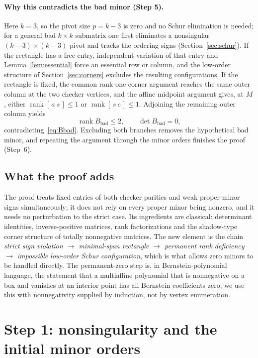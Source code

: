 \documentclass[10pt,a4paper]{article}
\theoremstyle{definition}
\theoremstyle{remark}
\numberwithin{equation}{section}
\DeclareMathOperator{\rank}{rank}
\begin{document}
\paragraph{Why this contradicts the bad minor (Step 5).}
Here $k=3$, so the pivot size $p=k-3$ is zero and no Schur elimination
is needed; for a general bad $k\times k$ submatrix one first eliminates
a nonsingular $(k-3)\times(k-3)$ pivot and tracks the ordering signs
(Section~\ref{sec:schur}). If the rectangle has a free entry, independent
variation of that entry and Lemma~\ref{lem:essential} force an essential
row or column, and the low-order structure of Section~\ref{sec:corners}
excludes the resulting configurations. If the rectangle is fixed, the
common rank-one corner argument reaches the same outer column at the two
checker vertices, and the affine midpoint argument gives, at $M$, either
$\rank[\,a\ s\,]\leq1$ or $\rank[\,s\ c\,]\leq1$. Adjoining the remaining
outer column yields
\begin{equation}\label{eq:contra55}
 \rank B_{\mathrm{bad}}\leq2,\qquad \det B_{\mathrm{bad}}=0,
\end{equation}
contradicting~\eqref{eq:Bbad}. Excluding both branches removes the
hypothetical bad minor, and repeating the argument through the minor
orders finishes the proof (Step~6).

\subsection{What the proof adds}
The proof treats fixed entries of both checker parities and weak
proper-minor signs simultaneously; it does not rely on every proper minor
being nonzero, and it needs no perturbation to the strict case. Its
ingredients are classical: determinant identities, inverse-positive
matrices, rank factorizations and the shadow-type corner structure of
totally nonnegative matrices. The new element is the chain
\emph{strict sign violation $\to$ minimal-span rectangle $\to$ permanent
rank deficiency $\to$ impossible low-order Schur configuration}, which is
what allows zero minors to be handled directly. The permanent-zero step is,
in Bernstein-polynomial language, the statement that a multiaffine
polynomial that is nonnegative on a box and vanishes at an interior
point has all Bernstein coefficients zero; we use this with nonnegativity
supplied by induction, not by vertex enumeration.

\section{Step 1: nonsingularity and the initial minor orders}\label{sec:initial}
\end{document}
